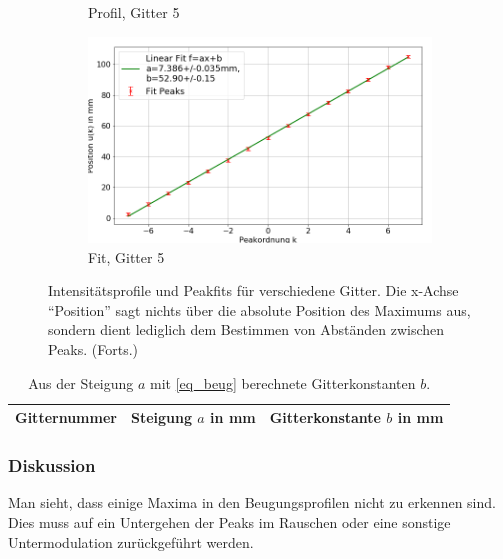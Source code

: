\documentclass[
	a4paper,
	12pt,
	pagesize,
	ngerman
]{scrartcl}
\begin{document}
\begin{figure}[H]
\begin{subfigure}[b]{0.475\textwidth}
            \caption%
            {Profil, Gitter 5}
            \label{fig_2_profil_g5}
        \end{subfigure}
        \hfill
        \begin{subfigure}[b]{0.475\textwidth}
            \centering
            \includegraphics[width=\textwidth]{img/2/2_gitter_g5_fit}
            \caption[]%
            {Fit, Gitter 5}
            \label{fig_2_fit_g5}
        \end{subfigure}
        \caption%
        {
				Intensitätsprofile und Peakfits für verschiedene Gitter.
				Die x-Achse \enquote{Position} sagt nichts über die absolute Position des Maximums aus, sondern dient lediglich dem Bestimmen von Abständen zwischen Peaks. (Forts.)
				}
        \label{fig_2_mix_2}
    \end{figure}

\begin{table}[H]
		\centering
		\begin{tabular}{ c | c | c }
			 Gitternummer & Steigung $a$ in \si{mm} & Gitterkonstante $b$ in \si{mm} \\ \hline
			 
		\end{tabular}
		\caption{
		Aus der Steigung $a$ mit \cref{eq_beug} berechnete Gitterkonstanten $b$.
		}
		\label{tb_2_beug}
\end{table}
	\subsubsection*{Diskussion}
	Man sieht, dass einige Maxima in den Beugungsprofilen nicht zu erkennen sind.
	Dies muss auf ein Untergehen der Peaks im Rauschen oder eine sonstige Untermodulation zurückgeführt werden. %
\end{document}
